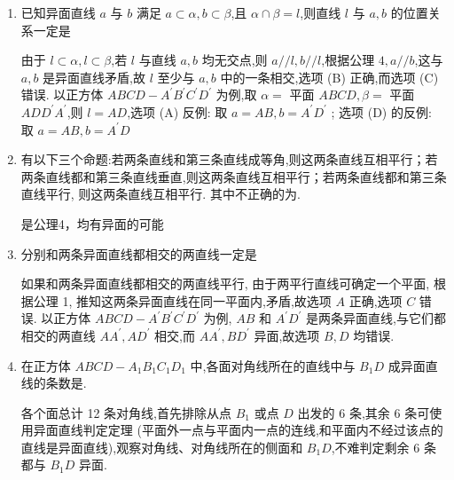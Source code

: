 \begin{enumerate}
\begin{jieda}
        若直线 $l$ 不经过点 $A$,则过 $A$ 点作直线 ${l}^{\prime }//l$,若直线 $l$ 经过点 $A$,取 ${l}^{\prime } = l$. 在空间中,任作一条过点 $A$ 且与直线 ${l}^{\prime }$ 成 $\dfrac{\pi }{3}$ 角的直线,再将该直线绕着直线 ${l}^{\prime }$ 旋转一周 (得到两个对顶的圆锥),即得到无数条符合要求的直线.
    \end{jieda}
    \item 已知异面直线 $a$ 与 $b$ 满足 $a \subset  \alpha,b \subset  \beta$,且 $\alpha  \cap  \beta  = l$,则直线 $l$ 与 $a,b$ 的位置关系一定是
    \begin{jieda}
        由于 $l \subset  \alpha,l \subset  \beta$,若 $l$ 与直线 $a,b$ 均无交点,则 $a//l,b//l$,根据公理 $4,a//b$,这与 $a,b$ 是异面直线矛盾,故 $l$ 至少与 $a,b$ 中的一条相交,选项 (B) 正确,而选项 (C) 错误. 以正方体 ${ABCD} - {A}^{\prime }{B}^{\prime }{C}^{\prime }{D}^{\prime }$ 为例,取 $\alpha  =$ 平面 ${ABCD},\beta  =$ 平面 ${AD}{D}^{\prime }{A}^{\prime }$,则 $l = {AD}$,选项 (A) 反例: 取 $a = {AB},b = {A}^{\prime }{D}^{\prime }$ ; 选项 (D) 的反例: 取 $a = {AB},b = {A}^{\prime }D$
    \end{jieda}
    \item 有以下三个命题:若两条直线和第三条直线成等角,则这两条直线互相平行；若两条直线都和第三条直线垂直,则这两条直线互相平行；若两条直线都和第三条直线平行, 则这两条直线互相平行. 其中不正确的为.
    \begin{jieda}
        是公理4，均有异面的可能
    \end{jieda}
    \item 分别和两条异面直线都相交的两直线一定是
    \begin{jieda}
        如果和两条异面直线都相交的两直线平行, 由于两平行直线可确定一个平面, 根据公理 1, 推知这两条异面直线在同一平面内,矛盾,故选项 $A$ 正确,选项 $C$ 错误. 以正方体 ${ABCD} - {A}^{\prime }{B}^{\prime }{C}^{\prime }{D}^{\prime }$ 为例, ${AB}$ 和 ${A}^{\prime }{D}^{\prime }$ 是两条异面直线,与它们都相交的两直线 $A{A}^{\prime },A{D}^{\prime }$ 相交,而 $A{A}^{\prime },B{D}^{\prime }$ 异面,故选项 $B,D$ 均错误.
    \end{jieda}
    \item 在正方体 ${ABCD} - {A}_{1}{B}_{1}{C}_{1}{D}_{1}$ 中,各面对角线所在的直线中与 ${B}_{1}D$ 成异面直线的条数是.
    \begin{jieda}
        各个面总计 12 条对角线,首先排除从点 ${B}_{1}$ 或点 $D$ 出发的 6 条,其余 6 条可使用异面直线判定定理 (平面外一点与平面内一点的连线,和平面内不经过该点的直线是异面直线),观察对角线、对角线所在的侧面和 ${B}_{1}D$,不难判定剩余 6 条都与 ${B}_{1}D$ 异面.
    \end{jieda}
\end{enumerate}
